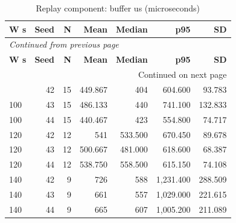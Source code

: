 \documentclass[10pt,a4paper]{article}
\begin{document}
\begin{longtable}{@{}lrrrrrr@{}}
\caption{Replay component:\allowbreak{} buffer us (microseconds)}\\
\toprule
\textbf{W s} & \textbf{Seed} & \textbf{N} & \textbf{Mean} & \textbf{Median} & \textbf{p95} & \textbf{SD} \\
\midrule\endfirsthead
\multicolumn{7}{l}{\small\itshape Continued from previous page}\\
\toprule
\textbf{W s} & \textbf{Seed} & \textbf{N} & \textbf{Mean} & \textbf{Median} & \textbf{p95} & \textbf{SD} \\
\midrule\endhead
\midrule\multicolumn{7}{r}{\small Continued on next page}\\\endfoot
\bottomrule\endlastfoot
100 & 42 & 15 & 449.867 & 404 & 604.600 & 93.783 \\
100 & 43 & 15 & 486.133 & 440 & 741.100 & 132.833 \\
100 & 44 & 15 & 440.467 & 423 & 554.800 & 74.717 \\
120 & 42 & 12 & 541 & 533.500 & 670.450 & 89.678 \\
120 & 43 & 12 & 500.667 & 481.000 & 618.600 & 68.387 \\
120 & 44 & 12 & 538.750 & 558.500 & 615.150 & 74.108 \\
140 & 42 & 9 & 726 & 588 & 1,231.400 & 288.509 \\
140 & 43 & 9 & 661 & 557 & 1,029.000 & 221.615 \\
140 & 44 & 9 & 665 & 607 & 1,005.200 & 211.089 \\
\end{longtable}\endgroup
\begingroup\small\setlength{\tabcolsep}{4pt}\renewcommand{\arraystretch}{1.12}
\end{document}
